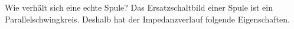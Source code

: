 \begin{karte}{Wie verhält sich eine echte Spule?}
	Das Ersatzschaltbild einer Spule ist ein Parallelschwingkreis. Deshalb hat der Impedanzverlauf folgende Eigenschaften.
	
	\begin{minipage}{0.48\textwidth}
		
	\end{minipage}
	\begin{minipage}{0.48\textwidth}
		
	\end{minipage}\\[5pt]
\end{karte}
